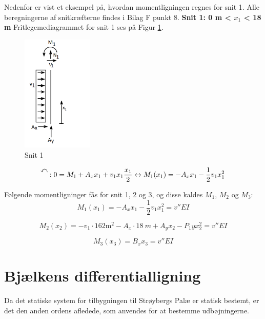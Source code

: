 Nedenfor er vist et eksempel på, hvordan momentligningen regnes for snit 1. Alle beregningerne af snitkræfterne findes i Bilag F punkt 8.
\newline
\newline
\textbf{Snit 1: 0 m < $x_1$ < 18 m}
\newline
Fritlegemediagrammet for snit 1 ses på Figur \ref{fig:snitetan}.
\begin{figure}[H]
	\centering
	\includegraphics[width=0.3\textwidth]{billeder/asnitet.png}
	\caption{Snit 1}
	\label{fig:snitetan}
\end{figure}
\begin{equation}
	\ALN{\text{ }}: 0 = M_1 + A_x x_1 + v_1x_1 \frac{x_1}{2} \leftrightarrow M_1(x_1)= {-A_x x_1-\frac{1}{2}v_1x_1^2}
\end{equation}

Følgende momentligninger fås for snit 1, 2 og 3, og disse kaldes $M_1$, $M_2$ og $M_3$:
\begin{equation}
	M_1(x_1)= -A_x x_1-\frac{1}{2}v_1x_1^2 = v''EI
\end{equation}

\begin{equation}
	M_2(x_2)= -v_1 \cdot 162 \text{m}^2 - A_x \cdot \SI{18}{m} + A_yx_2 - P_1y x_2^2 = v''EI
\end{equation}

\begin{equation}
	M_3(x_3)= B_xx_3 = v''EI
\end{equation}

\section{Bjælkens differentialligning}
Da det statiske system for tilbygningen til Strøybergs Palæ er statisk bestemt, er det den anden ordens afledede, som anvendes for at bestemme udbøjningerne.

